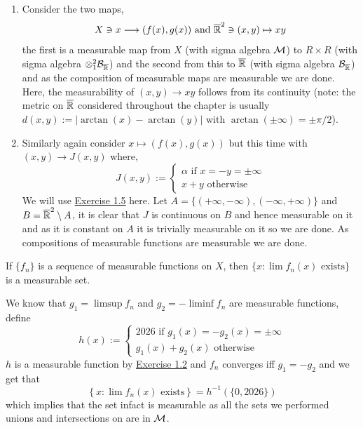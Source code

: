 \documentclass[12pt,a4paper]{article}
\begin{document}
\begin{solution}
    \begin{enumerate}[label=\alph*.]
        \item Consider the two maps,
        $$X\ni x\longrightarrow (f(x),g(x))\text{ and }\overline{\mathbb{R}}^2\ni(x,y)\mapsto xy$$
        the first is a measurable map from $X$ (with sigma algebra $\mathcal{M}$) to $R\times R$ (with sigma algebra $\otimes^2_1 \mathcal B_{\overline{\mathbb{R}}}$) and the second from this to $\overline{\mathbb{R}}$ (with sigma algebra $\mathcal B_{\overline{\mathbb{R}}}$) and as the composition of measurable maps are measurable we are done.
        Here, the measurability of $(x,y)\to xy$ follows from its continuity (note: the metric on $\overline{\mathbb{R}}$ considered throughout the chapter is usually $d(x,y):=|\arctan(x)-\arctan(y)|$ with $\arctan(\pm\infty)=\pm\pi/2$).
        \item Similarly again consider $x\mapsto(f(x),g(x))$ but this time with $(x,y)\to J(x,y)$ where,
        $$J(x,y):=\begin{cases}\alpha\text{ if }x=-y=\pm\infty\\ x+y\text{ otherwise}\end{cases}$$
        We will use \hyperref[prob:2-5]{Exercise 1.5} here. 
        Let $A=\{(+\infty,-\infty),(-\infty,+\infty)\}$ and $B=\overline{\mathbb{R}}^2\setminus A$, it is clear that $J$ is continuous on $B$ and hence measurable on it and as it is constant on $A$ it is trivially measurable on it so we are done.
        As compositions of measurable functions are measurable we are done.
    \end{enumerate}
\end{solution}
\begin{problem}\label{prob:2-3}
If $\{f_n\}$ is a sequence of measurable functions on $X$, then $\{x : \lim f_n(x) \text{ exists}\}$ is a measurable set.
\end{problem}
\begin{solution}
    We know that $g_1=\limsup f_n$ and $g_2=-\liminf f_n$ are measurable functions, define 
    $$h(x):=\begin{cases}2026\text{ if }g_1(x)=-g_2(x)=\pm\infty\\ g_1(x)+g_2(x)\text{ otherwise}\end{cases}$$
    $h$ is a measurable function by \hyperref[prob:2-2]{Exercise 1.2} and $f_n$ converges iff $g_1=-g_2$ and we get that 
    $$\left\{x:\lim f_n(x)\text{ exists}\right\}=h^{-1}(\{0,2026\})$$
    which implies that the set infact is measurable as all the sets we performed unions and intersections on are in $\mathcal{M}$.
\end{solution}
\end{document}
